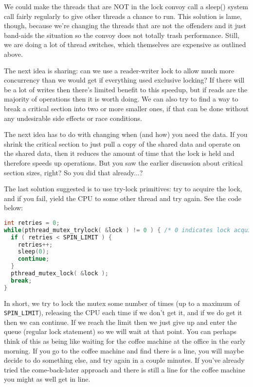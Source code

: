 We could make the threads that are NOT in the lock convoy call a sleep() system call fairly regularly to give other threads a chance to run. This solution is lame, though, because we're changing the threads that are not the offenders and it just band-aids the situation so the convoy does not totally trash performance. Still, we are doing a lot of thread switches, which themselves are expensive as outlined above.

The next idea is sharing: can we use a reader-writer lock to allow much more concurrency than we would get if everything used exclusive locking? If there will be a lot of writes then there's limited benefit to this speedup, but if reads are the majority of operations then it is worth doing. We can also try to find a way to break a critical section into two or more smaller ones, if that can be done without any undesirable side effects or race conditions.

The next idea has to do with changing when (and how) you need the data. If you shrink the critical section to just pull a copy of the shared data and operate on the shared data, then it reduces the amount of time that the lock is held and therefore speeds up operations. But you saw the earlier discussion about critical section sizes, right? So you did that already...?

The last solution suggested is to use try-lock primitives: try to acquire the lock, and if you fail, yield the CPU to some other thread and try again. See the code below:

\begin{lstlisting}[language=C]
int retries = 0;
while(pthread_mutex_trylock( &lock ) != 0 ) { /* 0 indicates lock acquired */
  if ( retries < SPIN_LIMIT ) {
    retries++;
    sleep(0);
    continue;
  }
  pthread_mutex_lock( &lock );
  break;
}
\end{lstlisting}

In short, we try to lock the mutex some number of times (up to a maximum of \texttt{SPIN\_LIMIT}), releasing the CPU each time if we don't get it, and if we do get it then we can continue. If we reach the limit then we just give up and enter the queue (regular lock statement) so we will wait at that point. You can perhaps think of this as being like waiting for the coffee machine at the office in the early morning. If you go to the coffee machine and find there is a line, you will maybe decide to do something else, and try again in a couple minutes. If you've already tried the come-back-later approach and there is still a line for the coffee machine you might as well get in line.

